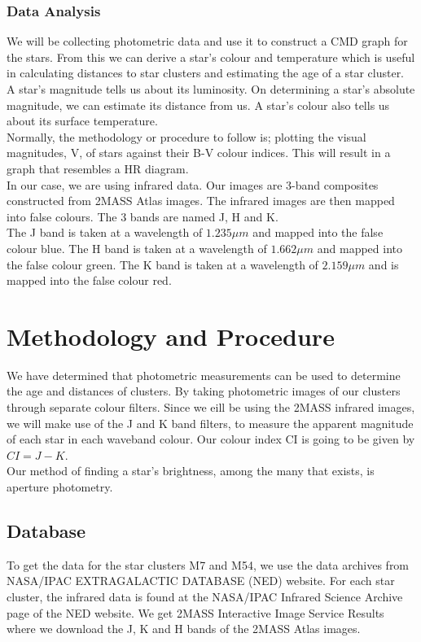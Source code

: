\documentclass[12pt, twocolumn]{aastex62}
\begin{document}
\subsubsection{Data Analysis}
We will be collecting photometric data and use it to construct a CMD graph for the stars. From this we can derive a star's colour and temperature which is useful in calculating distances to star clusters and estimating the age of a star cluster.\\
A star's magnitude tells us about its luminosity. On determining a star's absolute magnitude, we can estimate its distance from us. A star's colour also tells us about its surface temperature.\\
Normally, the methodology or procedure to follow is; plotting the visual magnitudes, V, of stars against their B-V colour indices. This will result in a graph that resembles a HR diagram.\\
In our case, we are using infrared data. Our images are 3-band composites constructed from 2MASS Atlas images. The infrared images are then mapped into false colours. The 3 bands are named J, H and K.\\
The J band is taken at a wavelength of $1.235\mu m$ and mapped into the false colour blue. The H band is taken at a wavelength of $1.662\mu m$ and mapped into the false colour green. The K band is taken at a wavelength of $2.159\mu m$ and is mapped into the false colour red.\\



\pagebreak
\section{Methodology and Procedure}
We have determined that photometric measurements can be used to determine the age and distances of clusters. By taking photometric images of our clusters through separate colour filters. Since we eill be using the 2MASS infrared images, we will make use of the J and K band filters, to measure the apparent magnitude of each star in each waveband colour. Our colour index CI is going to be given by $CI = J - K$.\\
Our method of finding a star's brightness, among the many that exists, is aperture photometry.
	\subsection{Database}
	To get the data for the star clusters M7 and M54, we use the data archives from NASA/IPAC EXTRAGALACTIC DATABASE (NED) website. For each star cluster, the infrared data is found at the NASA/IPAC Infrared Science Archive page of the NED website. We get 2MASS Interactive Image Service Results where we download the J, K and H bands of the 2MASS Atlas images.
\end{document}
